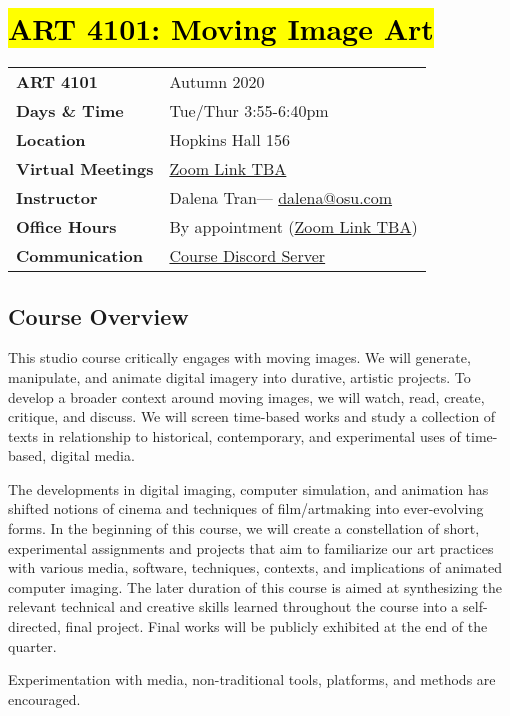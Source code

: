 \documentclass[12pt,letter,english]{report}
\makeatletter
\def\courseTitle{\hl{ART 4101: Moving Image Art}}
\def\courseNumber{ART 4101}
\def\courseSemester{Autumn 2020}
\def\courseTime{Tue/Thur 3:55-6:40pm}
\def\courseLocation{Hopkins Hall 156}
\def\instructor{Dalena Tran}
\def\emailURL{dalena@osu.com}
\def\instructorEmail{\href{mailto:\emailURL}{{\emailURL}}}
\def\zoomText{\href{\#}{{Zoom Link TBA}}}
\def\discordURL{}
\def\discordText{\href{\discordURL}{{Course Discord Server}}}
\makeatother
\begin{document}
\section*{\courseTitle}

\begin{tabularx}{\textwidth}{@{}l X@{}}
      \textbf{\courseNumber}    & \courseSemester                  \\
      \textbf{Days \& Time}     & \courseTime                      \\
      \textbf{Location}         & \courseLocation                  \\
      \textbf{Virtual Meetings} & \zoomText                        \\
      \textbf{Instructor}       & \instructor --- \instructorEmail \\
      \textbf{Office Hours}     & By appointment (\zoomText)       \\
      \textbf{Communication}    & \discordText                     \\
\end{tabularx}

\subsection{Course Overview}

This studio course critically engages with moving images. We will generate, manipulate, and animate digital imagery into durative, artistic projects. To develop a broader context around moving images, we will watch, read, create, critique, and discuss. We will screen time-based works and study a collection of texts in relationship to historical, contemporary, and experimental uses of time-based, digital media. 

The developments in digital imaging, computer simulation, and animation has shifted notions of cinema and techniques of film/artmaking into ever-evolving forms. In the beginning of this course, we will create a constellation of short, experimental assignments and projects that aim to familiarize our art practices with various media, software, techniques, contexts, and implications of animated computer imaging. The later duration of this course is aimed at synthesizing the relevant technical and creative skills learned throughout the course into a self-directed, final project. Final works will be publicly exhibited at the end of the quarter. 

Experimentation with media, non-traditional tools, platforms, and methods are encouraged.
\end{document}
